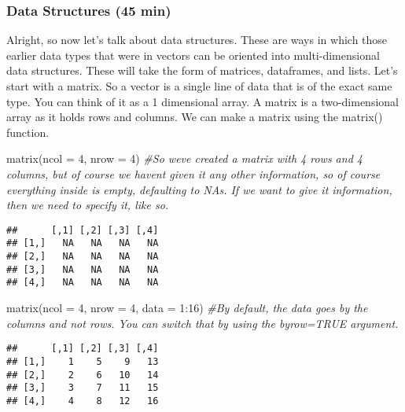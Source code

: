 \documentclass[
]{article}
\newenvironment{Shaded}{\begin{snugshade}}{\end{snugshade}}
\newcommand{\AttributeTok}[1]{\textcolor[rgb]{0.77,0.63,0.00}{#1}}
\newcommand{\CommentTok}[1]{\textcolor[rgb]{0.56,0.35,0.01}{\textit{#1}}}
\newcommand{\DecValTok}[1]{\textcolor[rgb]{0.00,0.00,0.81}{#1}}
\newcommand{\FunctionTok}[1]{\textcolor[rgb]{0.00,0.00,0.00}{#1}}
\newcommand{\NormalTok}[1]{#1}
\newcommand{\SpecialCharTok}[1]{\textcolor[rgb]{0.00,0.00,0.00}{#1}}
\begin{document}
\hypertarget{data-structures-45-min}{%
\subsubsection{Data Structures (45 min)}\label{data-structures-45-min}}

Alright, so now let's talk about data structures. These are ways in
which those earlier data types that were in vectors can be oriented into
multi-dimensional data structures. These will take the form of matrices,
dataframes, and lists. Let's start with a matrix. So a vector is a
single line of data that is of the exact same type. You can think of it
as a 1 dimensional array. A matrix is a two-dimensional array as it
holds rows and columns. We can make a matrix using the matrix()
function.

\begin{Shaded}
\begin{Highlighting}[]
\FunctionTok{matrix}\NormalTok{(}\AttributeTok{ncol =} \DecValTok{4}\NormalTok{, }\AttributeTok{nrow =} \DecValTok{4}\NormalTok{) }\CommentTok{\#So we\textquotesingle{}ve created a matrix with 4 rows and 4 columns, but of course we haven\textquotesingle{}t given it any other information, so of course everything inside is empty, defaulting to NA\textquotesingle{}s. If we want to give it information, then we need to specify it, like so.}
\end{Highlighting}
\end{Shaded}

\begin{verbatim}
##      [,1] [,2] [,3] [,4]
## [1,]   NA   NA   NA   NA
## [2,]   NA   NA   NA   NA
## [3,]   NA   NA   NA   NA
## [4,]   NA   NA   NA   NA
\end{verbatim}

\begin{Shaded}
\begin{Highlighting}[]
\FunctionTok{matrix}\NormalTok{(}\AttributeTok{ncol =} \DecValTok{4}\NormalTok{,}
       \AttributeTok{nrow =} \DecValTok{4}\NormalTok{,}
       \AttributeTok{data =} \DecValTok{1}\SpecialCharTok{:}\DecValTok{16}\NormalTok{) }\CommentTok{\#By default, the data goes by the columns and not rows. You can switch that by using the byrow=TRUE argument.}
\end{Highlighting}
\end{Shaded}

\begin{verbatim}
##      [,1] [,2] [,3] [,4]
## [1,]    1    5    9   13
## [2,]    2    6   10   14
## [3,]    3    7   11   15
## [4,]    4    8   12   16
\end{verbatim}
\end{document}
